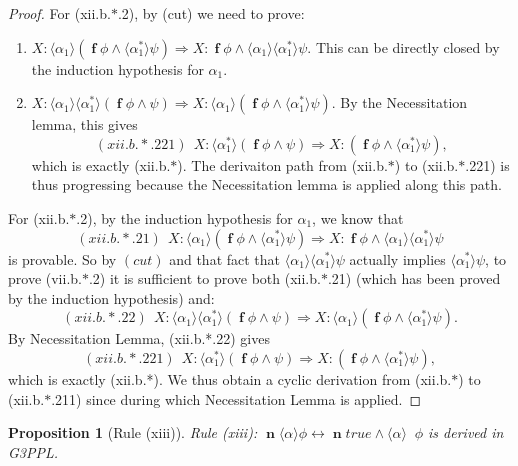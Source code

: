 \documentclass[manuscript,screen]{acmart}
\newtheorem{prop}{Proposition}[section]
\newcommand{\la}[0]{\langle}
\newcommand{\ra}[0]{\rangle}
\newcommand{\true}[0]{\mathit{true}}
\newcommand{\GiiiPPLcyc}[0]{\mbox{G3PPL}}
\DeclareMathOperator{\ofst}{\mathbf{f}}
\DeclareMathOperator{\nxt}{\mathbf{n}}
\DeclareMathOperator{\bnxt}{\bar{\nxt}}
\begin{document}
\begin{proof}
For (xii.b.$*$.2),  by (cut) we need to prove:
\begin{enumerate}
\item[(xii.b.*.21)] $X : \la\alpha_1\ra(\ofst\phi\wedge\la\alpha_1^*\ra\psi)\Rightarrow X : \ofst\phi\wedge\la\alpha_1\ra\la\alpha_1^*\ra\psi$. This can be directly closed by the induction hypothesis for $\alpha_1$.  
\item[(xii.b.*.22)] $X : \la\alpha_1\ra\la\alpha_1^*\ra(\ofst\phi\wedge\psi)\Rightarrow X : \la\alpha_1\ra(\ofst\phi\wedge\la\alpha_1^*\ra\psi)$. 
By the Necessitation lemma, this gives 
$$
(xii.b.*.221)\ \ X : \la\alpha_1^*\ra(\ofst\phi\wedge\psi)\Rightarrow X : (\ofst\phi\wedge\la\alpha_1^*\ra\psi), 
$$ 
which is exactly (xii.b.$*$). 
The derivaiton path from (xii.b.$*$) to (xii.b.$*$.221) is thus progressing because the Necessitation lemma is applied along this path. 
\end{enumerate}
\ifx
For (xii.b.$*$.2),  by the induction hypothesis for $\alpha_1$, we know that
$$
(xii.b.*.21)\ \ X : \la\alpha_1\ra(\ofst\phi\wedge\la\alpha_1^*\ra\psi)\Rightarrow X : \ofst\phi\wedge\la\alpha_1\ra\la\alpha_1^*\ra\psi
$$ is provable. 
So by $(cut)$ and that fact that $\la\alpha_1\ra\la\alpha^*_1\ra\psi$ actually implies $\la\alpha^*_1\ra\psi$, to prove (vii.b.$*$.2) it is sufficient to prove both (xii.b.$*$.21) (which has been proved by the induction hypothesis) and:
$$
(xii.b.*.22)\ \  X : \la\alpha_1\ra\la\alpha_1^*\ra(\ofst\phi\wedge\psi)\Rightarrow X : \la\alpha_1\ra(\ofst\phi\wedge\la\alpha_1^*\ra\psi). 
$$
By Necessitation Lemma, (xii.b.*.22) gives 
$$
(xii.b.*.221)\ \ X : \la\alpha_1^*\ra(\ofst\phi\wedge\psi)\Rightarrow X : (\ofst\phi\wedge\la\alpha_1^*\ra\psi), 
$$ 
which is exactly (xii.b.*). 
We thus obtain a cyclic derivation from (xii.b.$*$) to (xii.b.$*$.211) since during which Necessitation Lemma is applied. 
\fi
\end{proof}

\begin{prop}[Rule (xiii)]
Rule (xiii): 
$\nxt \la\alpha\ra \phi\leftrightarrow \nxt \true \wedge \la\alpha\ra \bnxt \phi$ 
is derived in \GiiiPPLcyc. 
\end{prop}
\end{document}
